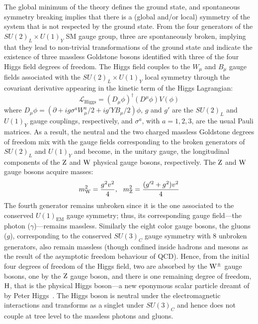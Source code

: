 The global minimum of the theory defines the ground state, and spontaneous symmetry breaking implies that there is a (global and/or local) symmetry of the system that is not respected by the ground state.
From the four generators of the $SU(2)_L \times U(1)_Y$ SM gauge group, three are spontaneously broken, implying that they lead to non-trivial transformations of the ground state and indicate the existence of three massless Goldstone bosons identified with three of the four Higgs field degrees of freedom.
The Higgs field couples to the $W_\mu$ and $B_\mu$ gauge fields associated with the $SU(2)_L \times U(1)_Y$ local symmetry through the covariant derivative appearing in the kinetic term of the Higgs Lagrangian:
\begin{equation}
    \mathcal{L}_\text{Higgs} = (D_\mu\phi)^\dagger(D^\mu\phi) V(\phi)
\end{equation}
where $D_\mu\phi=(\partial + ig\sigma^aW^a_\mu/2 + ig'YB_\mu/2)\phi$, $g$ and $g'$ are the $SU(2)_L$ and $U(1)_Y$ gauge couplings, respectively, and $\sigma^a$, with $a = 1,2,3$, are the usual Pauli matrices.
As a result, the neutral and the two charged massless Goldstone degrees of freedom mix with the gauge fields corresponding to the broken generators of $SU(2)_L$ and $U(1)_Y$ and become, in the unitary gauge, the longitudinal components of the $\mathrm{Z}$ and $\mathrm{W}$ physical gauge bosons, respectively.
The $\mathrm{Z}$ and $\mathrm{W}$ gauge bosons acquire masses:
\begin{equation}
    m_{\mathrm{W}}^2 = \frac{g^2v^2}{4}, \hspace{7pt} m_{\mathrm{Z}}^2 = \frac{(g'^2+g^2)v^2}{4}
\end{equation}
The fourth generator remains unbroken since it is the one associated to the conserved $U(1)_\text{EM}$ gauge symmetry; thus, its corresponding gauge field---the photon ($\gamma$)---remains massless.
Similarly the eight color gauge bosons, the gluons ($g$), corresponding to the conserved $SU(3)_C$ gauge symmetry with 8 unbroken generators, also remain massless (though confined inside hadrons and mesons as the result of the asymptotic freedom behaviour of QCD).
Hence, from the initial four degrees of freedom of the Higgs field, two are absorbed by the $\mathrm{W}^\pm$ gauge bosons, one by the $\mathrm{Z}$ gauge boson, and there is one remaining degree of freedom, $\mathrm{H}$, that is the physical Higgs boson---a new eponymous scalar particle dreamt of by Peter Higgs~\cite{PhysRevLett.13.321,PhysRev.145.1156}.
The Higgs boson is neutral under the electromagnetic interactions and transforms as a singlet under $SU(3)_C$ and hence does not couple at tree level to the massless photons and gluons.

